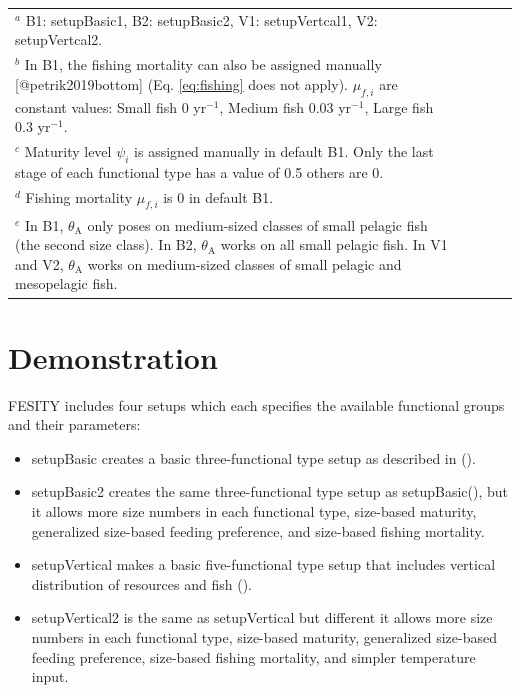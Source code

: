 \documentclass[
]{article}
\providecommand{\tightlist}{%
  \setlength{\itemsep}{0pt}\setlength{\parskip}{0pt}}
\begin{document}
\begin{table}[htbp]
\begin{tabular}{lp{8cm}lp{1cm}lp{1cm}lp{1cm}lp{1cm}l}
\hline
\multicolumn{7}{l}{\footnotesize $^a$ B1: setupBasic1, B2: setupBasic2, V1: setupVertcal1, V2: setupVertcal2.} \\
\multicolumn{7}{p{\dimexpr\linewidth-2\tabcolsep}}{\footnotesize $^b$ In B1, the fishing mortality can also be assigned manually [@petrik2019bottom] (Eq. \ref{eq:fishing} does not apply). $\mu_{f,i}$ are constant values: Small fish 0 yr$^{-1}$, Medium fish 0.03 yr$^{-1}$, Large fish 0.3 yr$^{-1}$.}\\
\multicolumn{7}{p{\dimexpr\linewidth-2\tabcolsep}}{\footnotesize $^c$ Maturity level $\psi_i$ is assigned manually in default B1. Only the last stage of each functional type has a value of 0.5 others are 0.} \\
\multicolumn{7}{l}{\footnotesize $^d$ Fishing  mortality $\mu_{f,i}$ is 0 in default B1.} \\
\multicolumn{7}{p{\dimexpr\linewidth-2\tabcolsep}}{\footnotesize $^e$ In B1, $\theta_{\mathrm{A}}$ only poses on medium-sized classes of small pelagic fish (the second size class).
                                      In B2, $\theta_{\mathrm{A}}$ works on all small pelagic fish. 
                                      In V1 and V2, $\theta_{\mathrm{A}}$ works on medium-sized classes of small pelagic and mesopelagic fish.} \\

\end{tabular}
\end{table}

\section{Demonstration}\label{demonstration}

FESITY includes four setups which each specifies the available
functional groups and their parameters:

\begin{itemize}
\tightlist
\item
  setupBasic creates a basic three-functional type setup as described in
  ().
\item
  setupBasic2 creates the same three-functional type setup as
  setupBasic(), but it allows more size numbers in each functional type,
  size-based maturity, generalized size-based feeding preference, and
  size-based fishing mortality.
\item
  setupVertical makes a basic five-functional type setup that includes
  vertical distribution of resources and fish
  ().
\item
  setupVertical2 is the same as setupVertical but different it allows
  more size numbers in each functional type, size-based maturity,
  generalized size-based feeding preference, size-based fishing
  mortality, and simpler temperature input.
\end{itemize}
\end{document}
